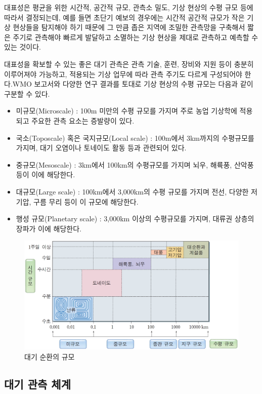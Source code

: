 대표성은 평균을 위한 시간적, 공간적 규모, 관측소 밀도, 기상 현상의 수평 규모 등에 따라서 결정되는데, 예를 들면 초단기 예보의 경우에는 시간적 공간적 규모가 작은 기상 현상들을 탐지해야 하기 때문에 그 만큼 좁은 지역에 조밀한 관측망을 구축해서 짧은 주기로 관측해야 빠르게 발달하고 소멸하는 기상 현상을 제대로 관측하고 예측할 수 있는 것이다. 

대표성을 확보할 수 있는 좋은 대기 관측은 관측 기술, 훈련, 장비와 지원 등이 충분히 이루어져야 가능하고, 적용되는 기상 업무에 따라 관측 주기도 다르게 구성되어야 한다.WMO 보고서와 다양한 연구 결과를 토대로 기상 현상의 수평 규모는 다음과 같이 구분할 수 있다.
\begin{itemize}
	\item 미규모(Microscale) : 100m 미만의 수평 규모를 가지며 주로 농업 기상학에 적용되고 주요한 관측 요소는 증발량이 있다.
	\item 국소(Toposcale) 혹은 국지규모(Local scale) : 100m에서 3km까지의 수평규모를 가지며, 대기 오염이나 토네이도 활동 등과 관련되어 있다.
	\item 중규모(Mesoscale) : 3km에서 100km의 수평규모를 가지며 뇌우, 해륙풍, 산악풍 등이 이에 해당한다.
	\item 대규모(Large scale) : 100km에서 3,000km의 수평 규모를 가지며 전선, 다양한 저기압, 구름 무리 등이 이 규모에 해당한다.
	\item 행성 규모(Planetary scale) : 3,000km 이상의 수평규모를 가지며, 대류권 상층의 장파가 이에 해당한다.
\end{itemize}

\begin{figure}
	\centering
	\includegraphics[width=0.9\linewidth]{21observing/images/C-E-o3O-F0-0301-00026-02}
	\caption{대기 순환의 규모}
	\label{fig:c-e-o3o-f0-0301-00026-02}
\end{figure}


\subsection{대기 관측 체계}

